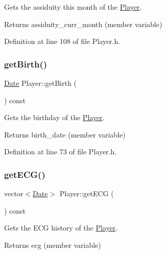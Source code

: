 Gets the assiduity this month of the \hyperlink{class_player}{Player}. 

\begin{DoxyReturn}{Returns}
assiduity\+\_\+curr\+\_\+month (member variable) 
\end{DoxyReturn}


Definition at line 108 of file Player.\+h.

\hypertarget{class_player_a40d25243f37af60da51b8020f7518700}{}\label{class_player_a40d25243f37af60da51b8020f7518700} 
\subsubsection{\texorpdfstring{get\+Birth()}{getBirth()}}
{\footnotesize\ttfamily \hyperlink{class_date}{Date} Player\+::get\+Birth (\begin{DoxyParamCaption}{ }\end{DoxyParamCaption}) const\hspace{0.3cm}{\ttfamily [inline]}}



Gets the birthday of the \hyperlink{class_player}{Player}. 

\begin{DoxyReturn}{Returns}
birth\+\_\+date (member variable) 
\end{DoxyReturn}


Definition at line 73 of file Player.\+h.

\hypertarget{class_player_a2d1d0a9a28323caa4003d1e09645389e}{}\label{class_player_a2d1d0a9a28323caa4003d1e09645389e} 
\subsubsection{\texorpdfstring{get\+E\+C\+G()}{getECG()}}
{\footnotesize\ttfamily vector$<$\hyperlink{class_date}{Date}$>$ Player\+::get\+E\+CG (\begin{DoxyParamCaption}{ }\end{DoxyParamCaption}) const\hspace{0.3cm}{\ttfamily [inline]}}



Gets the E\+CG history of the \hyperlink{class_player}{Player}. 

\begin{DoxyReturn}{Returns}
ecg (member variable) 
\end{DoxyReturn}


